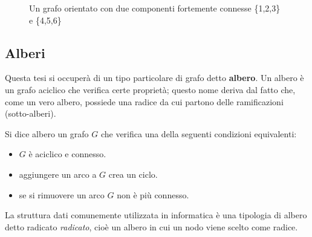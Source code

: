 \begin{example}

\begin{figure}[H]
  \centering
\caption{Un grafo orientato con due componenti fortemente connesse \{1,2,3\} e \{4,5,6\} \label{fig:3}}
\end{figure}
\end{example}

\newpage
\subsection{Alberi}
Questa tesi si occuperà di un tipo particolare di grafo detto \textbf{albero}. Un albero è un grafo aciclico che verifica certe proprietà; questo nome deriva dal fatto che, come un vero albero, possiede una radice da cui partono delle ramificazioni (sotto-alberi).
\begin{definition}[Albero]
Si dice albero un grafo $G$ che verifica una della seguenti condizioni equivalenti:
\begin{itemize}
\item $G$ è aciclico e connesso.
\item aggiungere un arco a $G$ crea un ciclo.
\item se si rimuovere un arco $G$ non è più connesso.
\end{itemize}
\end{definition}

La struttura dati comunemente utilizzata in informatica è una tipologia di albero detto radicato \emph{radicato}, cioè un albero in cui un nodo viene scelto come radice.


